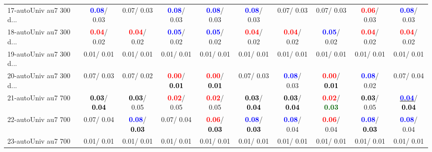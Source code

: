\begin{table}[h]
\begin{center}
{\begin{tabular}{lc|c|c|c|c|c|c|c|c}
17-autoUniv au7 300 d... & \textcolor{blue}{\textbf{  0.08}}/  0.03 &   0.07/  0.03 & \textcolor{blue}{\textbf{  0.08}}/  0.03 & \textcolor{blue}{\textbf{  0.08}}/  0.03 & \textcolor{blue}{\textbf{  0.08}}/  0.03 &   0.07/  0.03 &   0.07/  0.03 & \textcolor{red}{\textbf{  0.06}}/  0.03 & \textcolor{blue}{\textbf{  0.08}}/  0.03 \\
18-autoUniv au7 300 d... & \textcolor{red}{\textbf{  0.04}}/  0.02 & \textcolor{red}{\textbf{  0.04}}/  0.02 & \textcolor{blue}{\textbf{  0.05}}/  0.02 & \textcolor{blue}{\textbf{  0.05}}/  0.02 & \textcolor{red}{\textbf{  0.04}}/  0.02 & \textcolor{red}{\textbf{  0.04}}/  0.02 & \textcolor{blue}{\textbf{  0.05}}/  0.02 & \textcolor{red}{\textbf{  0.04}}/  0.02 & \textcolor{red}{\textbf{  0.04}}/  0.02 \\
19-autoUniv au7 300 d... &   0.01/  0.01 &   0.01/  0.01 &   0.01/  0.01 &   0.01/  0.01 &   0.01/  0.01 &   0.01/  0.01 &   0.01/  0.01 &   0.01/  0.01 &   0.01/  0.01 \\
20-autoUniv au7 300 d... &   0.07/  0.03 &   0.07/  0.02 & \textcolor{red}{\textbf{  0.00}}/\textcolor{black}{\textbf{  0.01}} & \textcolor{red}{\textbf{  0.00}}/\textcolor{black}{\textbf{  0.01}} &   0.07/  0.03 & \textcolor{blue}{\textbf{  0.08}}/  0.03 & \textcolor{red}{\textbf{  0.00}}/\textcolor{black}{\textbf{  0.01}} & \textcolor{blue}{\textbf{  0.08}}/  0.02 &   0.07/  0.04 \\
21-autoUniv au7 700 & \textcolor{black}{\textbf{  0.03}}/\textcolor{black}{\textbf{  0.04}} & \textcolor{black}{\textbf{  0.03}}/  0.05 & \textcolor{red}{\textbf{  0.02}}/  0.05 & \textcolor{red}{\textbf{  0.02}}/  0.05 & \textcolor{black}{\textbf{  0.03}}/\textcolor{black}{\textbf{  0.04}} & \textcolor{black}{\textbf{  0.03}}/\textcolor{black}{\textbf{  0.04}} & \textcolor{red}{\textbf{  0.02}}/\textcolor{darkgreen}{\textbf{  0.03}} & \textcolor{black}{\textbf{  0.03}}/  0.05 & \underline{\textcolor{blue}{\textbf{  0.04}}}/\textcolor{black}{\textbf{  0.04}} \\ \hline
22-autoUniv au7 700 &   0.07/  0.04 & \textcolor{blue}{\textbf{  0.08}}/\textcolor{black}{\textbf{  0.03}} &   0.07/  0.04 & \textcolor{red}{\textbf{  0.06}}/\textcolor{black}{\textbf{  0.03}} & \textcolor{blue}{\textbf{  0.08}}/\textcolor{black}{\textbf{  0.03}} & \textcolor{blue}{\textbf{  0.08}}/  0.04 & \textcolor{red}{\textbf{  0.06}}/  0.04 & \textcolor{blue}{\textbf{  0.08}}/\textcolor{black}{\textbf{  0.03}} & \textcolor{blue}{\textbf{  0.08}}/  0.04 \\
23-autoUniv au7 700 &   0.01/  0.01 &   0.01/  0.01 &   0.01/  0.01 &   0.01/  0.01 &   0.01/  0.01 &   0.01/  0.01 &   0.01/  0.01 &   0.01/  0.01 &   0.01/  0.01 \\

\end{tabular}}
\end{center}
\end{table}
